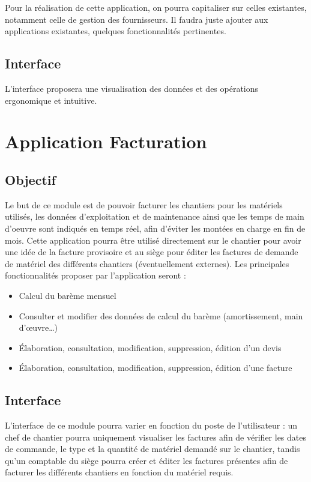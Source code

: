 	Pour la réalisation de cette application, on pourra capitaliser sur celles existantes, notamment celle de gestion des fournisseurs. Il faudra juste ajouter aux applications existantes, quelques fonctionnalités pertinentes.

	\subsection{Interface}
	L'interface proposera une visualisation des données et des opérations ergonomique et intuitive.

\section {Application Facturation}

	\subsection {Objectif}
	Le but de ce module est de pouvoir facturer les chantiers pour les matériels utilisés, les données d'exploitation et de maintenance ainsi que les temps de main d'oeuvre sont indiqués en temps réel, afin d'éviter les montées en charge en fin de mois. Cette application pourra être utilisé directement sur le chantier pour avoir une idée de la facture provisoire et au siège pour éditer les factures de demande de matériel des différents chantiers (éventuellement externes). Les principales fonctionnalités proposer par l'application seront :

       \begin{itemize}
	    \item Calcul du barème mensuel
	    \item Consulter et modifier des données de calcul du barème (amortissement, main d'œuvre…)
	    \item Élaboration, consultation, modification, suppression, édition d'un devis
	    \item Élaboration, consultation, modification, suppression, édition d'une facture
       \end{itemize}

	\subsection {Interface}
	L'interface de ce module pourra varier en fonction du poste de l'utilisateur : un chef de chantier pourra uniquement visualiser les factures afin de vérifier les dates de commande, le type et la quantité de matériel demandé sur le chantier, tandis qu'un comptable du siège pourra créer et éditer les factures présentes afin de facturer les différents chantiers en fonction du matériel requis.

